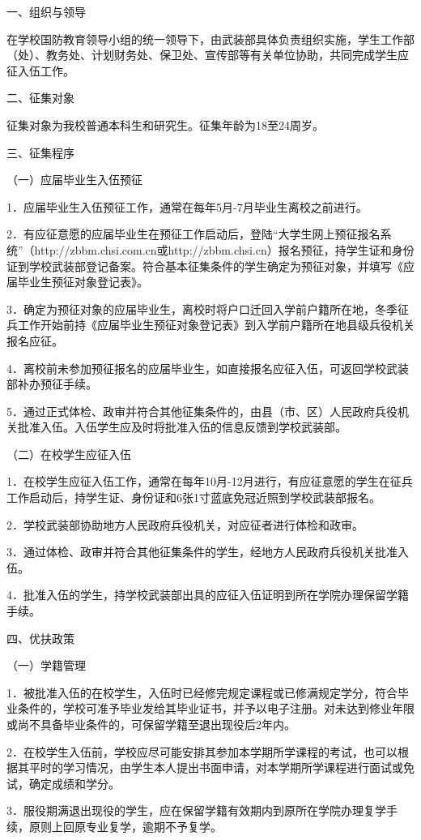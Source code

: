 \documentclass[UTF8,12pt,a4paper]{report}
\begin{document}
一、组织与领导

在学校国防教育领导小组的统一领导下，由武装部具体负责组织实施，学生工作部（处）、教务处、计划财务处、保卫处、宣传部等有关单位协助，共同完成学生应征入伍工作。

二、征集对象

征集对象为我校普通本科生和研究生。征集年龄为18至24周岁。

三、征集程序

（一）应届毕业生入伍预征

1．应届毕业生入伍预征工作，通常在每年5月-7月毕业生离校之前进行。

2．有应征意愿的应届毕业生在预征工作启动后，登陆“大学生网上预征报名系统”（http://zbbm.chsi.com.cn或http://zbbm.chsi.cn）报名预征，持学生证和身份证到学校武装部登记备案。符合基本征集条件的学生确定为预征对象，并填写《应届毕业生预征对象登记表》。

3．确定为预征对象的应届毕业生，离校时将户口迁回入学前户籍所在地，冬季征兵工作开始前持《应届毕业生预征对象登记表》到入学前户籍所在地县级兵役机关报名应征。

4．离校前未参加预征报名的应届毕业生，如直接报名应征入伍，可返回学校武装部补办预征手续。

5．通过正式体检、政审并符合其他征集条件的，由县（市、区）人民政府兵役机关批准入伍。入伍学生应及时将批准入伍的信息反馈到学校武装部。

（二）在校学生应征入伍

1．在校学生应征入伍工作，通常在每年10月-12月进行，有应征意愿的学生在征兵工作启动后，持学生证、身份证和6张1寸蓝底免冠近照到学校武装部报名。

2．学校武装部协助地方人民政府兵役机关，对应征者进行体检和政审。

3．通过体检、政审并符合其他征集条件的学生，经地方人民政府兵役机关批准入伍。

4．批准入伍的学生，持学校武装部出具的应征入伍证明到所在学院办理保留学籍手续。

四、优扶政策

（一）学籍管理

1．被批准入伍的在校学生，入伍时已经修完规定课程或已修满规定学分，符合毕业条件的，学校可准予毕业发给其毕业证书，并予以电子注册。对未达到修业年限或尚不具备毕业条件的，可保留学籍至退出现役后2年内。

2．在校学生入伍前，学校应尽可能安排其参加本学期所学课程的考试，也可以根据其平时的学习情况，由学生本人提出书面申请，对本学期所学课程进行面试或免试，确定成绩和学分。

3．服役期满退出现役的学生，应在保留学籍有效期内到原所在学院办理复学手续，原则上回原专业复学，逾期不予复学。
\end{document}
